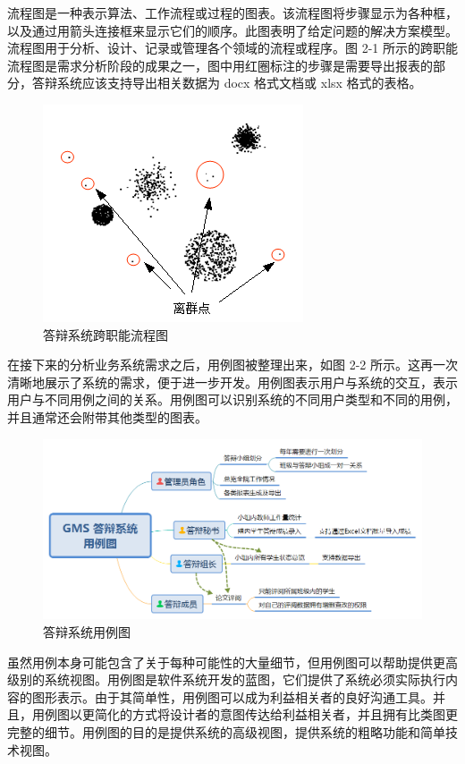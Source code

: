 流程图是一种表示算法、工作流程或过程的图表。该流程图将步骤显示为各种框，以及通过用箭头连接框来显示它们的顺序。此图表明了给定问题的解决方案模型。流程图用于分析、设计、记录或管理各个领域的流程或程序。图 2-1 所示的跨职能流程图是需求分析阶段的成果之一，图中用红圈标注的步骤是需要导出报表的部分，答辩系统应该支持导出相关数据为 docx 格式文档或 xlsx 格式的表格。

\begin{figure}
	\centering
	\includegraphics[width=0.85\linewidth]{figure/2-1}
	\caption{答辩系统跨职能流程图}
\end{figure}

在接下来的分析业务系统需求之后，用例图被整理出来，如图 2-2 所示。这再一次清晰地展示了系统的需求，便于进一步开发。用例图表示用户与系统的交互，表示用户与不同用例之间的关系。用例图可以识别系统的不同用户类型和不同的用例，并且通常还会附带其他类型的图表。

\begin{figure}
	\centering
	\includegraphics[width=0.85\linewidth]{figure/2-2}
	\caption{答辩系统用例图}
\end{figure}

虽然用例本身可能包含了关于每种可能性的大量细节，但用例图可以帮助提供更高级别的系统视图。用例图是软件系统开发的蓝图，它们提供了系统必须实际执行内容的图形表示。由于其简单性，用例图可以成为利益相关者的良好沟通工具。并且，用例图以更简化的方式将设计者的意图传达给利益相关者，并且拥有比类图更完整的细节。用例图的目的是提供系统的高级视图，提供系统的粗略功能和简单技术视图。


